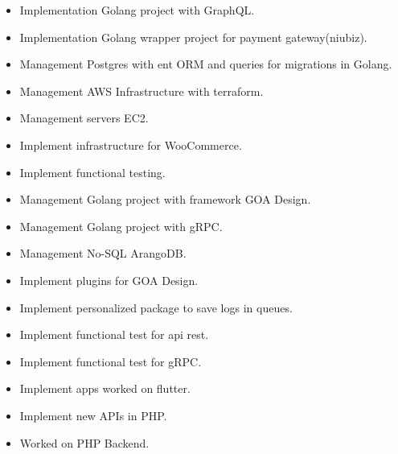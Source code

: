 \divider

\begin{itemize}
    \item Implementation Golang project with GraphQL.
    \item Implementation Golang wrapper project for payment gateway(niubiz).
    \item Management Postgres with ent ORM and queries for migrations in Golang.
    \item Management AWS Infrastructure with terraform.
    \item Management servers EC2.
    \item Implement infrastructure for WooCommerce.
    \item Implement functional testing.
\end{itemize}

\divider

\begin{itemize}
    \item Management Golang project with framework GOA Design.
    \item Management Golang project with gRPC.
    \item Management No-SQL ArangoDB.
    \item Implement plugins for GOA Design.
    \item Implement personalized package to save logs in queues.
    \item Implement functional test for api rest.
    \item Implement functional test for gRPC.
\end{itemize}

\divider

\begin{itemize}
    \item Implement apps worked on flutter.
    \item Implement new APIs in PHP.
    \item Worked on PHP Backend.
\end{itemize}

\divider

